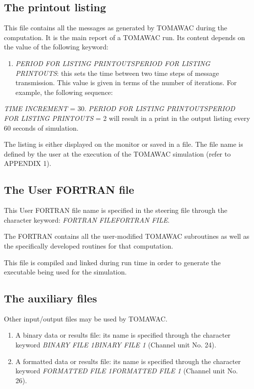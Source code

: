 \subsection{ The printout listing}

 This file contains all the messages as generated by TOMAWAC during the computation. It is the main report of a TOMAWAC run. Its content depends on the value of the following keyword:

\begin{enumerate}
\item  \textit{PERIOD FOR LISTING PRINTOUTSPERIOD FOR LISTING PRINTOUTS}: this sets the time between two time steps of message transmission. This value is given in terms of the number of iterations. For example, the following sequence:
\end{enumerate}

   \textit{TIME INCREMENT} = 30.    \textit{PERIOD FOR LISTING PRINTOUTSPERIOD FOR LISTING PRINTOUTS }= 2 will result in a print in the output listing every 60 seconds of simulation.

 The listing is either displayed on the monitor or saved in a file. The file name is defined by the user at the execution of the TOMAWAC simulation (refer to APPENDIX 1).


\subsection{ The User FORTRAN file}

 This User FORTRAN file name is specified in the steering file through the character keyword: \textit{FORTRAN FILEFORTRAN FILE}.\textit{}

 The FORTRAN contains all the user-modified TOMAWAC subroutines as well as the specifically developed routines for that computation.

 This file is compiled and linked during run time in order to generate the executable being used for the simulation.


\subsection{ The auxiliary files}

 Other input/output files may be used by TOMAWAC.

\begin{enumerate}
\item  A binary data or results file: its name is specified through the character keyword \textit{BINARY FILE 1BINARY FILE 1} (Channel unit No. 24).

\item  A formatted data or results file: its name is specified through the character keyword \textit{FORMATTED FILE 1FORMATTED FILE 1} (Channel unit No. 26).
\end{enumerate}

